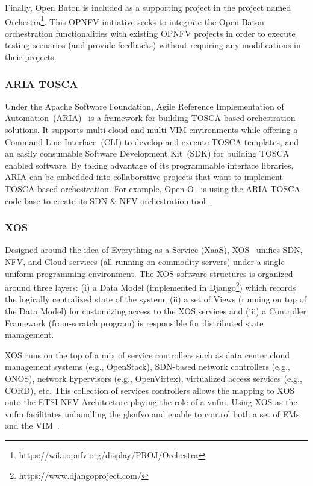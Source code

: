 Finally, Open Baton is included as a supporting project in the project named Orchestra\footnote{https://wiki.opnfv.org/display/PROJ/Orchestra}. This OPNFV initiative seeks to integrate the Open Baton orchestration functionalities with existing OPNFV projects in order to execute testing scenarios (and provide feedbacks) without requiring any modifications in their projects.

\subsubsection{ARIA TOSCA}
Under the Apache Software Foundation, Agile Reference Implementation of Automation~(ARIA)~\cite{ariatosca} is a framework for building TOSCA-based orchestration solutions. It supports multi-cloud and multi-VIM environments while offering a Command Line Interface~(CLI) to develop and execute TOSCA templates, and an easily consumable Software Development Kit~(SDK) for building TOSCA enabled software. By taking advantage of its programmable interface libraries, ARIA can be embedded into collaborative projects that want to implement TOSCA-based orchestration. For example, Open-O~\cite{Foundation} is using the ARIA TOSCA code-base to create its SDN \& NFV orchestration tool~\cite{ariatoscacloudify}.

\subsubsection{XOS}
Designed around the idea of Everything-as-a-Service (XaaS), XOS~\cite{peterson2015xos} unifies SDN, NFV, and Cloud services (all running on commodity servers) under a single uniform programming environment. The XOS software structures is organized around three layers: (i) a Data Model (implemented in Django\footnote{https://www.djangoproject.com/}) which records the logically centralized state of the system, (ii) a set of Views (running on top of the Data Model) for customizing access to the XOS services and (iii) a Controller Framework (from-scratch program) is responsible for distributed state management. 

XOS runs on the top of a mix of service controllers such as data center cloud management systems (e.g., OpenStack), SDN-based network controllers (e.g., ONOS), network hypervisors (e.g., OpenVirtex), virtualized access services (e.g., CORD), etc. This collection of services controllers allows the mapping to XOS onto the ETSI NFV Architecture playing the role of a \gls{vnfm}. Using XOS as the \gls{vnfm} facilitates unbundling the gls{nfvo} and enable to control both a set of EMs and the VIM~\cite{xos}.

